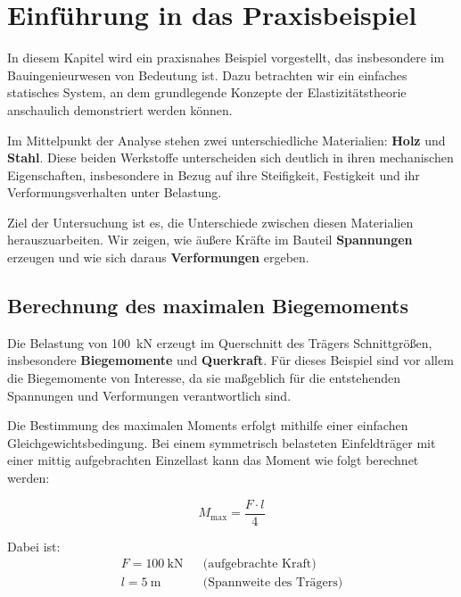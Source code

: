 %
%
%
%
\usepackage{siunitx}
\usepackage{amsmath}
\usepackage[ngerman]{babel}



\section*{Einführung in das Praxisbeispiel}

In diesem Kapitel wird ein praxisnahes Beispiel vorgestellt, das insbesondere im Bauingenieurwesen von Bedeutung ist. 
Dazu betrachten wir ein einfaches statisches System, an dem grundlegende Konzepte der Elastizitätstheorie anschaulich demonstriert werden können.

Im Mittelpunkt der Analyse stehen zwei unterschiedliche Materialien: \textbf{Holz} und \textbf{Stahl}. 
Diese beiden Werkstoffe unterscheiden sich deutlich in ihren mechanischen Eigenschaften, insbesondere in Bezug auf ihre Steifigkeit, Festigkeit und ihr Verformungsverhalten unter Belastung.

Ziel der Untersuchung ist es, die Unterschiede zwischen diesen Materialien herauszuarbeiten. 
Wir zeigen, wie äußere Kräfte im Bauteil \textbf{Spannungen} erzeugen und wie sich daraus \textbf{Verformungen} ergeben.

\subsection*{Berechnung des maximalen Biegemoments}

Die Belastung von \SI{100}{\kilo\newton} erzeugt im Querschnitt des Trägers Schnittgrößen, insbesondere \textbf{Biegemomente} und \textbf{Querkraft}. Für dieses Beispiel sind vor allem die Biegemomente von Interesse, da sie maßgeblich für die entstehenden Spannungen und Verformungen verantwortlich sind.

Die Bestimmung des maximalen Moments erfolgt mithilfe einer einfachen Gleichgewichtsbedingung. 
Bei einem symmetrisch belasteten Einfeldträger mit einer mittig aufgebrachten Einzellast kann das Moment wie folgt berechnet werden:

\[
M_\text{max} = \frac{F \cdot l}{4}
\]

Dabei ist:
\begin{align}
F = \SI{100}{\kilo\newton} && \text{(aufgebrachte Kraft)} \\
l = \SI{5}{\meter} && \text{(Spannweite des Trägers)}
\end{align}

